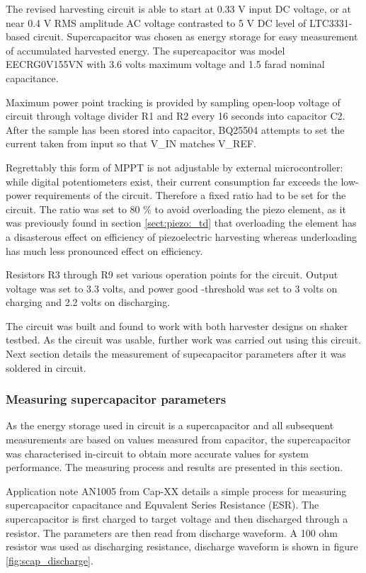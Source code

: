 The revised harvesting circuit is able to start at 0.33 V input DC voltage, or at near 0.4 V RMS amplitude AC voltage contrasted to 5 V DC level of LTC3331-based circuit. Supercapacitor was chosen as energy storage for easy measurement of accumulated harvested energy. The supercapacitor was model EECRG0V155VN \cite{panasonic_scap} with 3.6 volts maximum voltage and 1.5 farad nominal capacitance. 

Maximum power point tracking is provided by sampling open-loop voltage of circuit through voltage divider R1 and R2 every 16 seconds into capacitor C2. After the sample has been stored into capacitor, BQ25504 attempts to set the current taken from input so that V_IN matches V_REF. 

Regrettably this form of MPPT is not adjustable by external microcontroller: while digital potentiometers exist, their current consumption far exceeds the low-power requirements of the circuit. Therefore a fixed ratio had to be set for the circuit. The ratio was set to 80 \% to avoid overloading the piezo element, as it was previously found in section \ref{sect:piezo:_td} that overloading the element has a disasterous effect on efficiency of piezoelectric harvesting whereas underloading has much less pronounced effect on efficiency.

Resistors R3 through R9 set various operation points for the circuit. Output voltage was set to 3.3 volts, and power good -threshold was set to 3 volts on charging and 2.2 volts on discharging. 

The circuit was built and found to work with both harvester designs on shaker testbed. As the circuit was usable, further work was carried out using this circuit. Next section details the measurement of supecapacitor parameters after it was soldered in circuit.

\subsubsection{Measuring supercapacitor parameters}
As the energy storage used in circuit is a supercapacitor and all subsequent measurements are based on values measured from capacitor, the supercapacitor was characterised in-circuit to obtain more accurate values for system performance. The measuring process and results are presented in this section.

Application note AN1005 from Cap-XX \cite{capxxan1005} details a simple process for measuring supercapacitor capacitance and Equvalent Series Resistance (ESR). The supercapacitor is first charged to target voltage and then discharged through a resistor. The parameters are then read from discharge waveform. A 100 ohm resistor was used as discharging resistance, discharge waveform is shown in figure \ref{fig:scap_discharge}. 

